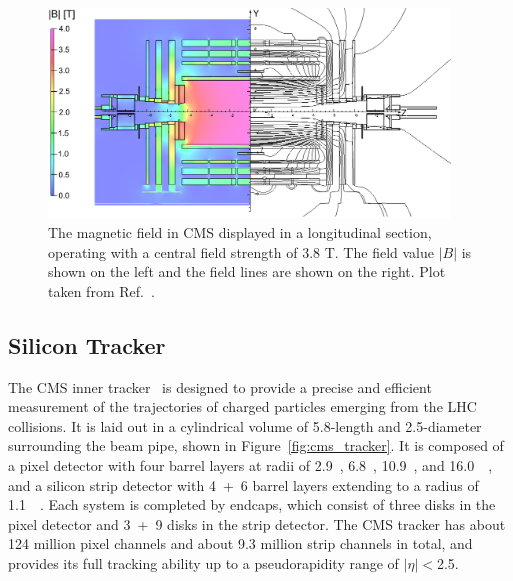 \begin{figure}[!htb]
    \centering
    \includegraphics[width=0.95\textwidth]{pics/LHC_CMS/CMS_field.png}
    \caption{The magnetic field in CMS displayed in a longitudinal section, operating with a central field strength of 3.8 T.
             The field value $|B|$ is shown on the left and the field lines are shown on the right.
             Plot taken from Ref.~\cite{Collaboration_2010}. }
    \label{fig:cms_field}
\end{figure}


\subsection{Silicon Tracker}\label{sec:tracker}

The CMS inner tracker~\cite{Collaboration_2008, phase1_tracker} is designed to provide a precise and efficient measurement of the trajectories of charged particles emerging from the LHC collisions.
It is laid out in a cylindrical volume of 5.8-\meter length and 2.5-\meter diameter surrounding the beam pipe, shown in Figure~\ref{fig:cms_tracker}.
It is composed of a pixel detector with four barrel layers at radii of 2.9~\cm, 6.8~\cm, 10.9~\cm, and 16.0~\cm~\cite{phase1_tracker},
and a silicon strip detector with 4~+~6 barrel layers extending to a radius of 1.1~\meter~\cite{Collaboration_2008}.
Each system is completed by endcaps, which consist of three disks in the pixel detector and 3~+~9 disks in the strip detector.
The CMS tracker has about 124 million pixel channels and about 9.3 million strip channels in total,
and provides its full tracking ability up to a pseudorapidity range of $|\eta| < $2.5.

